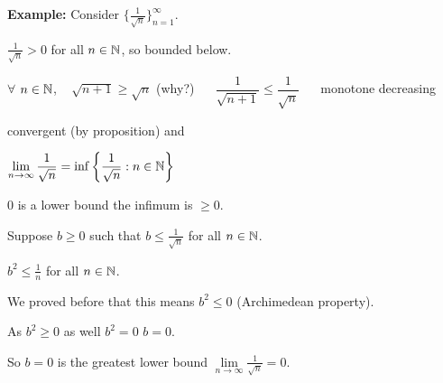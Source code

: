 \documentclass[10pt,aspectratio=149]{beamer}
\begin{document}
\begin{frame}

\textbf{Example:}
Consider $\bigl\{ \frac{1}{\sqrt{n}} \bigr\}_{n=1}^\infty$.

\medskip
\pause

$\frac{1}{\sqrt{n}} > 0$ for all $n \in {\mathbb{N}}$, so bounded below.

\pause
$\forall$ $n \in {\mathbb{N}}$, ~
$\sqrt{n+1} \geq \sqrt{n}$ (why?)
\pause
~\thus~
$\dfrac{1}{\sqrt{n+1}} \leq \dfrac{1}{\sqrt{n}}$
\pause
~\thus~
monotone decreasing

\medskip
\pause
\thus \quad convergent (by proposition) and

\medskip
\pause

$\displaystyle
\lim_{n\to \infty} \frac{1}{\sqrt{n}}
=
\inf \left\{ \frac{1}{\sqrt{n}} : n \in {\mathbb{N}} \right\}$

\medskip
\pause

$0$ is a lower bound \wthus the infimum is $\geq 0$.

\medskip
\pause

Suppose $b \geq 0$ such that 
$b \leq \frac{1}{\sqrt{n}}$ for all $n \in {\mathbb{N}}$.

\pause
\thus \quad
$b^2 \leq \frac{1}{n}$ for all $n \in {\mathbb{N}}$.

\pause
\medskip

We proved before that this means $b^2 \leq 0$ (Archimedean property).

\pause
\medskip

As $b^2 \geq 0$ as well \wthus $b^2 = 0$ \pause \wthus $b=0$.

\pause
\medskip

So $b=0$ is the greatest lower bound \pause\wthus
$\lim\limits_{n\to\infty} \frac{1}{\sqrt{n}} = 0$.
\end{frame}
\end{document}

